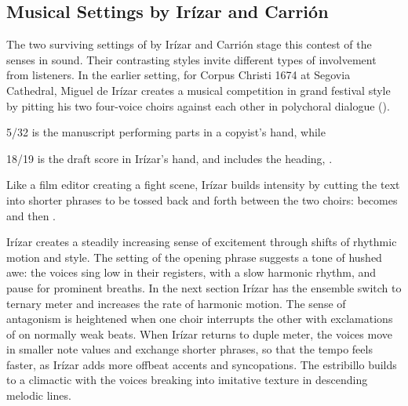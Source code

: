\subsection{Musical Settings by Irízar and Carrión}

The two surviving settings of  by Irízar and Carrión stage this contest of the senses in sound.
Their contrasting styles invite different types of involvement from listeners.
In the earlier setting, for Corpus Christi 1674 at Segovia Cathedral, Miguel de Irízar creates a musical competition in grand festival style by pitting his two four-voice choirs against each other in polychoral dialogue ().%
\begin{Footnote}
  \signature{E-SE}{5/32} is the manuscript performing parts in a copyist's hand, while \signature{E-SE}{18/19} is the draft score in Irízar's hand, and includes the heading, .
\end{Footnote}
Like a film editor creating a fight scene, Irízar builds intensity by cutting the text into shorter phrases to be tossed back and forth between the two choirs:  becomes  and then . 


Irízar creates a steadily increasing sense of excitement through shifts of rhythmic motion and style.
The setting of the opening phrase suggests a tone of hushed awe: the voices sing low in their registers, with a slow harmonic rhythm, and pause for prominent breaths.
In the next section Irízar has the ensemble switch to ternary meter and increases the rate of harmonic motion.
The sense of antagonism is heightened when one choir interrupts the other with exclamations of  on normally weak beats.
When Irízar returns to duple meter, the voices move in smaller note values and exchange shorter phrases, so that the tempo feels faster, as Irízar adds more offbeat accents and syncopations.
The estribillo builds to a climactic  with the voices breaking into imitative texture in descending melodic lines.

